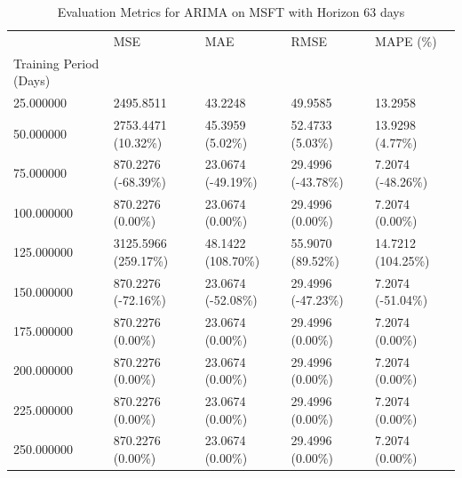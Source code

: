 \begin{table}
\caption{Evaluation Metrics for ARIMA on MSFT with Horizon 63 days}
\label{tab:arima_MSFT_h63_metrics}
\begin{tabular}{lllll}
\toprule
 & MSE & MAE & RMSE & MAPE (\%) \\
Training Period (Days) &  &  &  &  \\
\midrule
25.000000 & 2495.8511 & 43.2248 & 49.9585 & 13.2958 \\
50.000000 & 2753.4471 (10.32\%) & 45.3959 (5.02\%) & 52.4733 (5.03\%) & 13.9298 (4.77\%) \\
75.000000 & 870.2276 (-68.39\%) & 23.0674 (-49.19\%) & 29.4996 (-43.78\%) & 7.2074 (-48.26\%) \\
100.000000 & 870.2276 (0.00\%) & 23.0674 (0.00\%) & 29.4996 (0.00\%) & 7.2074 (0.00\%) \\
125.000000 & 3125.5966 (259.17\%) & 48.1422 (108.70\%) & 55.9070 (89.52\%) & 14.7212 (104.25\%) \\
150.000000 & 870.2276 (-72.16\%) & 23.0674 (-52.08\%) & 29.4996 (-47.23\%) & 7.2074 (-51.04\%) \\
175.000000 & 870.2276 (0.00\%) & 23.0674 (0.00\%) & 29.4996 (0.00\%) & 7.2074 (0.00\%) \\
200.000000 & 870.2276 (0.00\%) & 23.0674 (0.00\%) & 29.4996 (0.00\%) & 7.2074 (0.00\%) \\
225.000000 & 870.2276 (0.00\%) & 23.0674 (0.00\%) & 29.4996 (0.00\%) & 7.2074 (0.00\%) \\
250.000000 & 870.2276 (0.00\%) & 23.0674 (0.00\%) & 29.4996 (0.00\%) & 7.2074 (0.00\%) \\
\bottomrule
\end{tabular}
\end{table}

